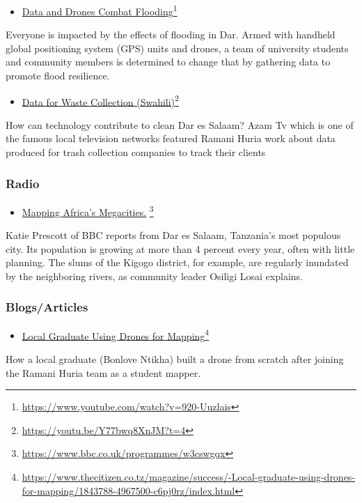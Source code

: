 \documentclass[a4paper,12pt,twoside]{article}
\begin{document}
\begin{itemize}
    \item \href{https://www.youtube.com/watch?v=920-Uuzlais}{Data and Drones Combat Flooding}\footnote{\url{https://www.youtube.com/watch?v=920-Uuzlais}}
\end{itemize}

Everyone is impacted by the effects of flooding in Dar. Armed with handheld global positioning system (GPS) units and drones, a team of university students and community members is determined to change that by gathering data to promote flood resilience.

\begin{itemize}
    \item \href{https://youtu.be/Y77bwq8XnJM?t=4}{ Data for Waste Collection (Swahili)}\footnote{\url{https://youtu.be/Y77bwq8XnJM?t=4}}
\end{itemize}

How can technology contribute to clean Dar es Salaam? Azam Tv which is one of the famous local television networks featured Ramani Huria work about data produced for trash collection companies to track their clients

\bigskip
\subsubsection{Radio}
\bigskip
\begin{itemize}
    \item \href{https://www.bbc.co.uk/programmes/w3cswgqx}{Mapping Africa's Megacities.} \footnote{\url{https://www.bbc.co.uk/programmes/w3cswgqx}}
\end{itemize}

Katie Prescott of BBC reports from Dar es Salaam, Tanzania's most populous city. Its population is growing at more than 4 percent every year, often with little planning. The slums of the  Kigogo district, for example, are regularly inundated by the neighboring rivers, as community leader Osiligi Losai explains.

\newpage
\subsubsection {Blogs/Articles}

\begin{itemize}
    \item \href{https://www.thecitizen.co.tz/magazine/success/-Local-graduate-using-drones-for-mapping/1843788-4967500-c6pj0rz/index.html}{Local Graduate Using Drones for Mapping}\footnote{\url{https://www.thecitizen.co.tz/magazine/success/-Local-graduate-using-drones-for-mapping/1843788-4967500-c6pj0rz/index.html}}
\end{itemize}
How a local graduate (Bonlove Ntikha) built a drone from scratch after joining the Ramani Huria team as a student mapper.
\end{document}

